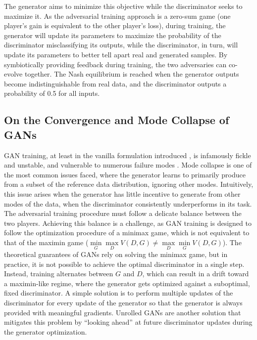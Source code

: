 The generator aims to minimize this objective while the discriminator seeks to maximize it. As the adversarial training approach is a zero-sum game (one player’s gain is equivalent to the other player’s loss), during training, the generator will update its parameters to maximize the probability of the discriminator misclassifying its outputs, while the discriminator, in turn, will update its parameters to better tell apart real and generated samples. By symbiotically providing feedback during training, the two adversaries can co-evolve together. The Nash equilibrium is reached when the generator outputs become indistinguishable from real data, and the discriminator outputs a probability of 0.5 for all inputs.

\subsection*{On the Convergence and Mode Collapse of GANs}
GAN training, at least in the vanilla formulation introduced \cite{goodfellow2014generative}, is infamously fickle and unstable, and vulnerable to numerous failure modes \cite{salimans2016improved}. Mode collapse is one of the most common issues faced, where the generator learns to primarily produce from a subset of the reference data distribution, ignoring other modes. Intuitively, this issue arises when the generator has little incentive to generate from other modes of the data, when the discriminator consistently underperforms in its task. The adversarial training procedure must follow a delicate balance between the two players. Achieving this balance is a challenge, as GAN training is designed to follow the optimization procedure of a minimax game, which is not equivalent to that of the maximin game ($\min\limits_{G} \max\limits_{D} V(D, G) \neq \max\limits_{D} \min\limits_{G} V(D, G)$). The theoretical guarantees of GANs rely on solving the minimax game, but in practice, it is not possible to achieve the optimal discriminator in a single step. Instead, training alternates between $G$ and $D$, which can result in a drift toward a maximin-like regime, where the generator gets optimized against a suboptimal, fixed discriminator. A simple solution is to perform multiple updates of the discriminator for every update of the generator so that the generator is always provided with meaningful gradients. Unrolled GANs \cite{metz2016unrolled} are another solution that mitigates this problem by “looking ahead” at future discriminator updates during the generator optimization. 

